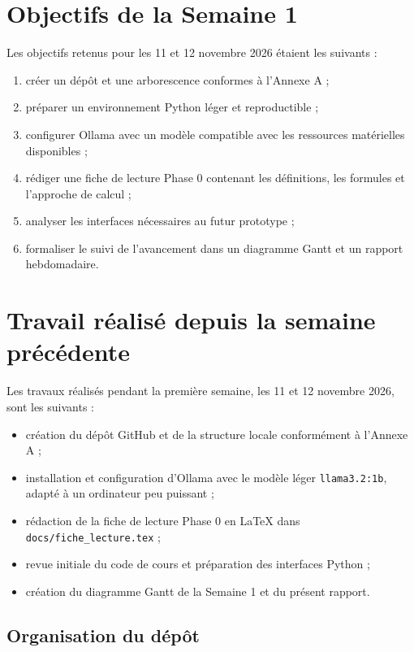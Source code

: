 \documentclass[11pt,a4paper]{article}
\begin{document}
\section{Objectifs de la Semaine 1}

Les objectifs retenus pour les 11 et 12 novembre 2026 étaient les suivants :

\begin{enumerate}
    \item créer un dépôt et une arborescence conformes à l'Annexe A ;
    \item préparer un environnement Python léger et reproductible ;
    \item configurer Ollama avec un modèle compatible avec les ressources
    matérielles disponibles ;
    \item rédiger une fiche de lecture Phase 0 contenant les définitions,
    les formules et l'approche de calcul ;
    \item analyser les interfaces nécessaires au futur prototype ;
    \item formaliser le suivi de l'avancement dans un diagramme Gantt et un
    rapport hebdomadaire.
\end{enumerate}

\section{Travail réalisé depuis la semaine précédente}

Les travaux réalisés pendant la première semaine, les 11 et 12 novembre 2026,
sont les suivants :

\begin{itemize}
    \item création du dépôt GitHub et de la structure locale conformément à
    l'Annexe A ;
    \item installation et configuration d'Ollama avec le modèle léger
    \texttt{llama3.2:1b}, adapté à un ordinateur peu puissant ;
    \item rédaction de la fiche de lecture Phase 0 en LaTeX dans
    \texttt{docs/fiche\_lecture.tex} ;
    \item revue initiale du code de cours et préparation des interfaces Python ;
    \item création du diagramme Gantt de la Semaine 1 et du présent rapport.
\end{itemize}

\subsection{Organisation du dépôt}
\end{document}
